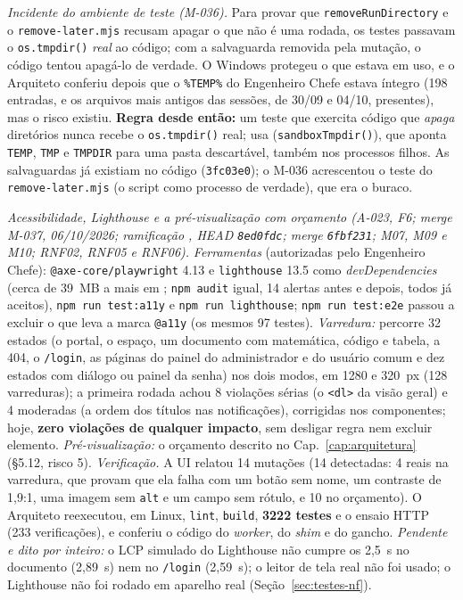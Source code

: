 \emph{Incidente do ambiente de teste (M-036).} Para provar que \texttt{removeRunDirectory} e o \texttt{remove-later.mjs} recusam apagar o que não é uma rodada, os testes passavam o \texttt{os.tmpdir()} \emph{real} ao código; com a salvaguarda removida pela mutação, o código tentou apagá-lo de verdade. O Windows protegeu o que estava em uso, e o Arquiteto conferiu depois que o \texttt{\%TEMP\%} do Engenheiro Chefe estava íntegro (198 entradas, e os arquivos mais antigos das sessões, de 30/09 e 04/10, presentes), mas o risco existiu. \textbf{Regra desde então:} um teste que exercita código que \emph{apaga} diretórios nunca recebe o \texttt{os.tmpdir()} real; usa  (\texttt{sandboxTmpdir()}), que aponta \texttt{TEMP}, \texttt{TMP} e \texttt{TMPDIR} para uma pasta descartável, também nos processos filhos. As salvaguardas já existiam no código (\texttt{3fc03e0}); o M-036 acrescentou o teste do \texttt{remove-later.mjs} (o script como processo de verdade), que era o buraco.

\emph{Acessibilidade, Lighthouse e a pré-visualização com orçamento (A-023, F6; merge M-037, 06/10/2026; ramificação , HEAD \texttt{8ed0fdc}; merge \texttt{6fbf231}; M07, M09 e M10; RNF02, RNF05 e RNF06).} \emph{Ferramentas} (autorizadas pelo Engenheiro Chefe): \texttt{@axe-core/playwright} 4.13 e \texttt{lighthouse} 13.5 como \emph{devDependencies} (cerca de 39~MB a mais em ; \texttt{npm audit} igual, 14 alertas antes e depois, todos já aceitos), \texttt{npm run test:a11y} e \texttt{npm run lighthouse}; \texttt{npm run test:e2e} passou a excluir o que leva a marca \texttt{@a11y} (os mesmos 97 testes). \emph{Varredura:}  percorre 32 estados (o portal, o espaço, um documento com matemática, código e tabela, a 404, o \texttt{/login}, as páginas do painel do administrador e do usuário comum e dez estados com diálogo ou painel da senha) nos dois modos, em 1280 e 320~px (128 varreduras); a primeira rodada achou 8 violações sérias (o \texttt{<dl>} da visão geral) e 4 moderadas (a ordem dos títulos nas notificações), corrigidas nos componentes; hoje, \textbf{zero violações de qualquer impacto}, sem desligar regra nem excluir elemento. \emph{Pré-visualização:} o orçamento descrito no Cap.~\ref{cap:arquitetura} (\S5.12, risco 5). \emph{Verificação.} A UI relatou 14 mutações (14 detectadas: 4 reais na varredura, que provam que ela falha com um botão sem nome, um contraste de 1,9:1, uma imagem sem \texttt{alt} e um campo sem rótulo, e 10 no orçamento). O Arquiteto reexecutou, em Linux, \texttt{lint}, \texttt{build}, \textbf{3222 testes} e o ensaio HTTP (233 verificações), e conferiu o código do \emph{worker}, do \emph{shim} e do gancho. \emph{Pendente e dito por inteiro:} o LCP simulado do Lighthouse não cumpre os 2,5~s no documento (2,89~s) nem no \texttt{/login} (2,59~s); o leitor de tela real não foi usado; o Lighthouse não foi rodado em aparelho real (Seção~\ref{sec:testes-nf}).

